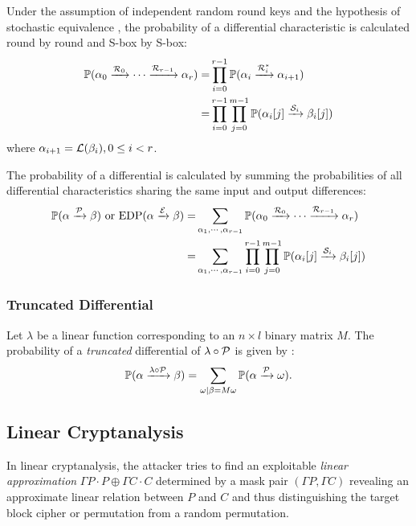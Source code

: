 Under the assumption of independent random round keys and the hypothesis of stochastic equivalence \cite{lai1991markov}, the probability of a differential characteristic is calculated round by round and S-box by S-box:
\begin{align*}
    \mathbb{P}(\alpha_0\xrightarrow{\mathcal{R}_0}\cdots\xrightarrow{\mathcal{R}_{r-1}}\alpha_r)
    =&\prod\limits_{i=0}^{r-1}\mathbb{P}(\alpha_i\xrightarrow{\mathcal{R}_i^*}\alpha_{i+1})\\
    =&\prod\limits_{i=0}^{r-1}\prod\limits_{j=0}^{m-1}\mathbb{P}(\alpha_i[j]\xrightarrow{\mathcal{S}_i}\beta_i[j])
\end{align*}
where $\alpha_{i+1}=\mathcal{L}(\beta_i),0\leq i<r$. 

The probability of a differential is calculated by summing the probabilities of all differential characteristics sharing the same input and output differences:
\begin{align*}
    \mathbb{P}(\alpha\xrightarrow{\mathcal{P}}\beta) \text{ or } \text{EDP}(\alpha\xrightarrow{\mathcal{E}}\beta)=&\sum\limits_{\alpha_1,\cdots,\alpha_{r-1}}\mathbb{P}(\alpha_0\xrightarrow{\mathcal{R}_0}\cdots\xrightarrow{\mathcal{R}_{r-1}}\alpha_r)\\
    =&\sum\limits_{\alpha_1,\cdots,\alpha_{r-1}}\prod\limits_{i=0}^{r-1}\prod\limits_{j=0}^{m-1}\mathbb{P}(\alpha_i[j]\xrightarrow{\mathcal{S}_i}\beta_i[j])
\end{align*}

\subsubsection{Truncated Differential}
Let $\lambda$ be a linear function corresponding to an $n\times l$ binary matrix $M$. The probability of a \textit{truncated} differential of $\lambda\circ\mathcal{P}$ is given by \cite{daemen2002design}:
\[
    \mathbb{P}(\alpha\xrightarrow{\lambda\circ\mathcal{P}}\beta)=\sum\limits_{\omega|\beta=M\omega}\mathbb{P}(\alpha\xrightarrow{\mathcal{P}}\omega).
\]

\subsection{Linear Cryptanalysis}

In linear cryptanalysis, the attacker tries to find an exploitable \textit{linear approximation}  $\Gamma P\cdot P\oplus \Gamma C\cdot C$ determined by a mask pair $(\Gamma P,\Gamma C)$ revealing an approximate linear relation between $P$ and $C$ and thus distinguishing the target block cipher or permutation from a random permutation. 

